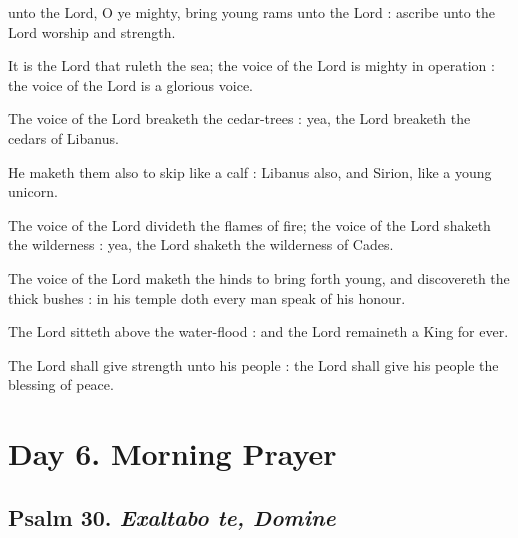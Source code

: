  unto the Lord, O ye mighty, bring young rams unto the Lord : ascribe unto the Lord worship and strength.\par
{}
It is the Lord that ruleth the sea; the voice of the Lord is mighty in operation : the voice of the Lord is a glorious voice.\par
{}The voice of the Lord breaketh the cedar-trees : yea, the Lord breaketh the cedars of Libanus.\par
{}He maketh them also to skip like a calf : Libanus also, and Sirion, like a young unicorn.\par
{}The voice of the Lord divideth the flames of fire; the voice of the Lord shaketh the wilderness : yea, the Lord shaketh the wilderness of Cades.\par
{}The voice of the Lord maketh the hinds to bring forth young, and discovereth the thick bushes : in his temple doth every man speak of his honour.\par
{}The Lord sitteth above the water-flood : and the Lord remaineth a King for ever.\par
{}The Lord shall give strength unto his people : the Lord shall give his people the blessing of peace.\par

\section*{Day 6. Morning Prayer}

\subsection{Psalm 30. \textit{Exaltabo te, Domine}}

